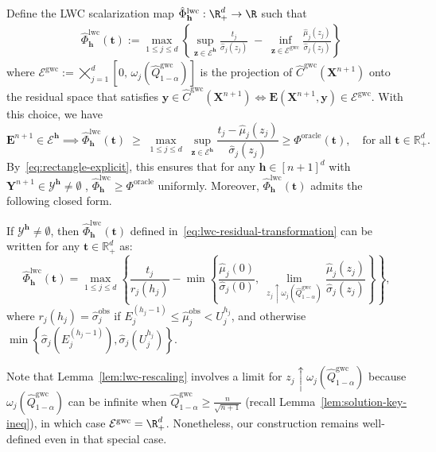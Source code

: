 Define the LWC scalarization map $\hat{\Phi}^{\mathrm{lwc}}_{\mathbf{h}}: \R^d_+ \to \R$ such that
\begin{align}
\label{eq:lwc-residual-transformation}
& \hat{\Phi}^{\mathrm{lwc}}_{\mathbf{h}}(\mathbf t)
:= \max_{1 \le j \le d}
\left\{
\sup_{\mathbf{z} \in \mathcal{E}^{\mathbf{h}}}\frac{t_j}{\hat{\sigma}_j(z_j)}
\;-\;
\inf_{\mathbf{z} \in \mathcal{E}^{\mathrm{gwc}}}\frac{\hat{\mu}_j(z_j)}{\hat{\sigma}_j(z_j)}
\right\}
\end{align}
where $\mathcal{E}^{\mathrm{gwc}}
:= 
\bigtimes_{j=1}^{d} \left[0,\, \omega_j(\hat{Q}^{\mathrm{gwc}}_{1-\alpha})\right]$ is the projection of $\hat{C}^\mathrm{gwc}(\mathbf{X}^{n+1})$ onto the residual space that satisfies $\mathbf y \in \hat{C}^\mathrm{gwc}(\mathbf{X}^{n+1}) \iff \mathbf E(\mathbf{X}^{n+1}, \mathbf y) \in \mathcal{E}^{\mathrm{gwc}}$. 
With this choice, we have
\begin{equation}
\mathbf{E}^{n+1}\in \mathcal{E}^{\mathbf{h}}\implies
\hat{\Phi}^{\mathrm{lwc}}_{\mathbf{h}}(\mathbf t)
\;\ge\;
\max_{1 \le j \le d}\;
\sup_{\mathbf{z}\in \mathcal{E}^{\mathbf{h}}}\frac{t_j-\hat{\mu}_j(z_j)}{\hat{\sigma}_j(z_j)} \geq \Phi^{\mathrm{oracle}}(\mathbf t),
\quad \text{for all } \mathbf t\in\mathbb{R}^d_+.
\label{eq:lwc-transformation-bound}
\end{equation}
By~\eqref{eq:rectangle-explicit}, this ensures that for any $\mathbf{h} \in [n+1]^d$ with $\mathbf{Y}^{n+1} \in \mathcal{Y}^{\mathbf{h}} \neq \emptyset$
, $\hat{\Phi}^{\mathrm{lwc}}_{\mathbf{h}}\geq \Phi^{\mathrm{oracle}}$ uniformly. Moreover, $\hat{\Phi}^{\mathrm{lwc}}_{\mathbf{h}}(\mathbf t)$ admits the following closed form.
\begin{lemma}
\label{lem:lwc-rescaling}
If $\mathcal{Y}^{\mathbf{h}}\neq \emptyset$, then $\hat{\Phi}^{\mathrm{lwc}}_{\mathbf{h}}(\mathbf t)$ defined in~\eqref{eq:lwc-residual-transformation} can be written for any $\mathbf t\in\mathbb{R}^d_+$ as:
\[
\hat{\Phi}^{\mathrm{lwc}}_{\mathbf{h}}(\mathbf t)
= \max_{1 \le j \le d}
\left\{
\frac{t_j}{r_j(h_j)}
-
\min\!\left\{
\frac{\hat{\mu}_j(0)}{\hat{\sigma}_j(0)},\;
\lim_{z_j \uparrow \omega_j(\hat{Q}^{\mathrm{gwc}}_{1-\alpha})}
\frac{\hat{\mu}_j(z_j)}{\hat{\sigma}_j(z_j)}
\right\}
\right\},
\]
where $r_j(h_j)=\hat{\sigma}^\mathrm{obs}_j$ if $E^{(h_j-1)}_j \leq \hat{\mu}^\mathrm{obs}_j < U^{h_j}_j$, and otherwise $\min\left\{\hat{\sigma}_j(E^{(h_j-1)}_j), \hat{\sigma}_j(U^{h_j}_j)\right\}$.
\end{lemma}
Note that Lemma~\ref{lem:lwc-rescaling} involves a limit for $z_j \uparrow \omega_j(\hat{Q}^{\mathrm{gwc}}_{1-\alpha})$ because $\omega_j(\hat{Q}^{\mathrm{gwc}}_{1-\alpha})$ can be infinite when $\hat{Q}^{\mathrm{gwc}}_{1-\alpha} \geq \frac{n}{\sqrt{n+1}}$ (recall Lemma~\ref{lem:solution-key-ineq}), in which case $\mathcal{E}^\mathrm{gwc} = \R^d_+$. 
Nonetheless, our construction remains well-defined even in that special case.

